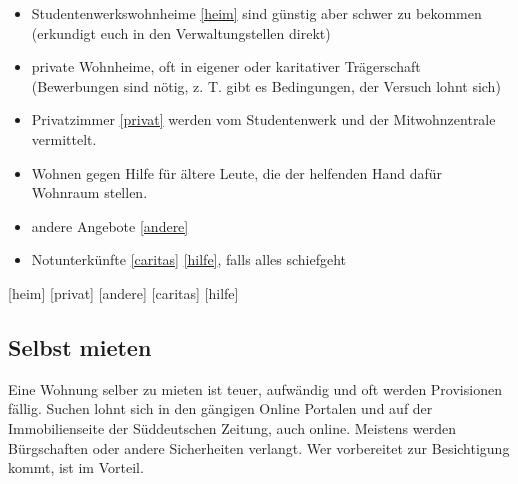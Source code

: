 \begin{itemize}
\item Studentenwerkswohnheime \ref{heim} sind 
	günstig aber schwer zu bekommen (erkundigt euch in den Verwaltungstellen direkt)
\item private Wohnheime, oft in eigener oder karitativer Trägerschaft
  (Bewerbungen sind nötig, z. T. gibt es Bedingungen, der Versuch lohnt sich)
\item
  Privatzimmer \ref{privat}
  werden vom Studentenwerk und der Mitwohnzentrale vermittelt.
\item Wohnen gegen Hilfe für ältere Leute, die der helfenden Hand dafür
  Wohnraum stellen.
\item andere Angebote \ref{andere}
\item Notunterkünfte \ref{caritas} \ref{hilfe}, falls alles schiefgeht
\end{itemize}

\begin{urlList}
	[heim]
	[privat]
	[andere]
	[caritas]
	[hilfe]
\end{urlList}


\subsection*{Selbst mieten} 
Eine Wohnung selber zu mieten ist teuer, aufwändig und oft werden Provisionen fällig. Suchen
lohnt sich in den gängigen Online Portalen und auf der Immobilienseite der
Süddeutschen Zeitung, auch online. Meistens werden Bürgschaften oder andere
Sicherheiten verlangt.  Wer vorbereitet zur Besichtigung kommt, ist im Vorteil.


